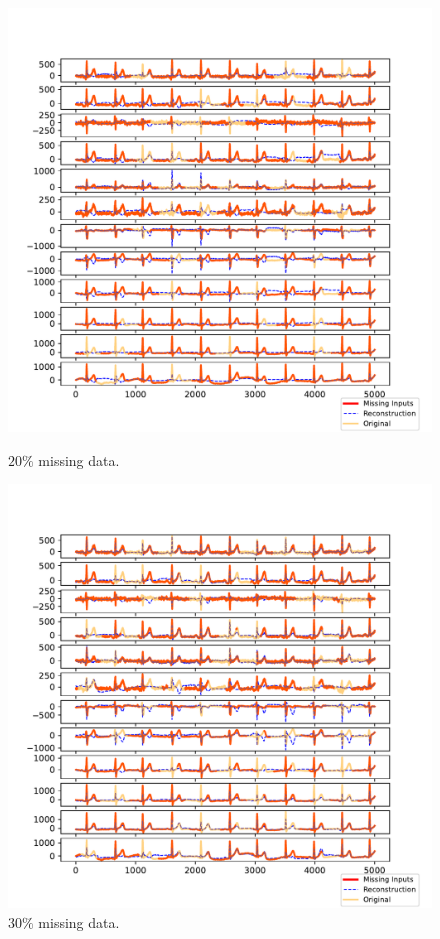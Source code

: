\documentclass{mldsmsc}
\begin{document}
\begin{figure}[H]
\centering
\begin{minipage}{0.4\linewidth}
    \centering
    \includegraphics[width=\linewidth]{images/missing/tmf_output_20_10.pdf}
    \caption{$20\%$ missing data.}
\end{minipage}%
\hspace{0.05\linewidth}
\begin{minipage}{0.4\linewidth}
    \centering
    \includegraphics[width=\linewidth]{images/missing/tmf_output_30_10.pdf}
    \caption{$30\%$ missing data.}
\end{minipage}


\end{figure}
\end{document}
